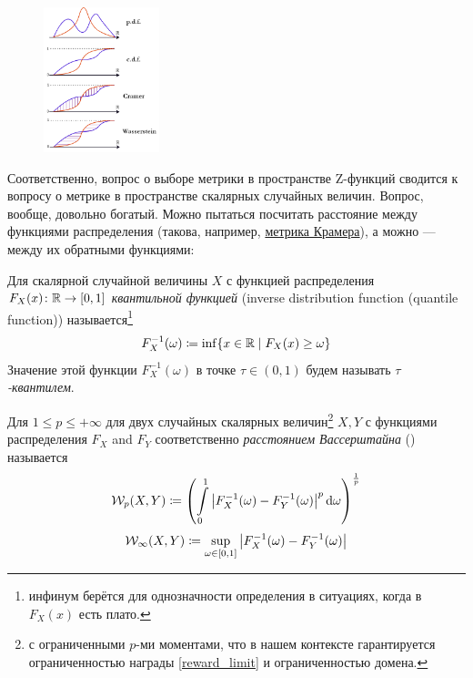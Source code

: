 \begin{figure}
\vspace{-0.5cm}
\centering
\includegraphics[width=0.3\textwidth]{Images/Wasserstein.png}
\vspace{-5.3cm}
\end{figure}

Соответственно, вопрос о выборе метрики в пространстве Z-функций сводится к вопросу о метрике в пространстве скалярных случайных величин. Вопрос, вообще, довольно богатый. Можно пытаться посчитать расстояние между функциями распределения (такова, например, \href{https://en.wikipedia.org/wiki/Energy_distance}{метрика Крамера}), а можно --- между их обратными функциями:

\begin{definition}
Для скалярной случайной величины $X$ с функцией распределения $F_X(x) \colon \mathbb{R} \to [0, 1]$ \emph{квантильной функцией} (inverse distribution function (quantile function)) называется\footnote{инфинум берётся для однозначности определения в ситуациях, когда в $F_X(x)$ есть плато.}
$$F^{-1}_X(\omega) \coloneqq \inf\{ x \in \mathbb{R} \mid F_X(x) \ge \omega \}$$
Значение этой функции $F^{-1}_X(\omega)$ в точке $\tau \in (0, 1)$ будем называть \emph{$\tau$-квантилем}. 
\end{definition}

\begin{definition}
Для $1 \le p \le +\infty$ для двух случайных скалярных величин\footnote{с ограниченными $p$-ми моментами, что в нашем контексте гарантируется ограниченностью награды \eqref{reward_limit} и ограниченностью домена.} $X, Y$ с функциями распределения $F_X$ and $F_Y$ соответственно \emph{расстоянием Вассерштайна} () называется
\begin{equation}\label{wasserstein}
    \mathcal{W}_p(X, Y) \coloneqq \left( \int\limits_0^1 \left| F_X^{-1}(\omega) - F_Y^{-1}(\omega) \right| ^p \mathop{}\!\mathrm{d} \omega \right)^{\frac{1}{p}}
\end{equation}
$$\mathcal{W}_\infty(X, Y) \coloneqq \sup_{\omega \in [0,1]} \left| F_X^{-1}(\omega) - F_Y^{-1}(\omega) \right| $$
\end{definition}

